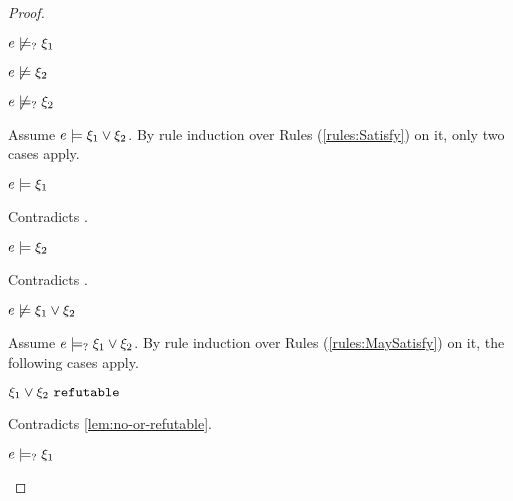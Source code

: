 \begin{proof}
\begin{byCases}
\begin{byCases}
\begin{pfsteps*}
        \item $e \not\models_{?} \xi_1$  
        \item $e \not\models \xi_2$  
        \item $e \not\models_{?} \xi_2$  
        \end{pfsteps*}
        Assume $e \models \xi_1 \vee \xi_2$. By rule induction over Rules (\ref{rules:Satisfy}) on it, only two cases apply.
        \begin{byCases}
        \item[\text{(\ref{rule:CSOr1})}]
            \begin{pfsteps*}
            \item $e \models \xi_1$ 
            \end{pfsteps*}
            Contradicts .
        \item[\text{(\ref{rule:CSOr2})}]
            \begin{pfsteps*}
            \item $e \models \xi_2$ 
            \end{pfsteps*}
            Contradicts .
        \end{byCases}
        \begin{pfsteps*}
        \item $e \not\models \xi_1 \vee \xi_2$  
        \end{pfsteps*}
        Assume $e \models_{?} \xi_1 \vee \xi_2$. By rule induction over Rules (\ref{rules:MaySatisfy}) on it, the following cases apply.
        \begin{byCases}
        \item[\text{(\ref{rule:CMSNotVal})}]
            \begin{pfsteps*}
            \item $\xi_1 \vee \xi_2 ~\mathtt{refutable}$ 
            \end{pfsteps*}
            Contradicts \autoref{lem:no-or-refutable}.
        \item[\text{(\ref{rule:CMSOr1})}]
            \begin{pfsteps*}
            \item $e \models_{?} \xi_1$ 

\end{pfsteps*}
\end{byCases}
\end{byCases}
\end{byCases}
\end{proof}
